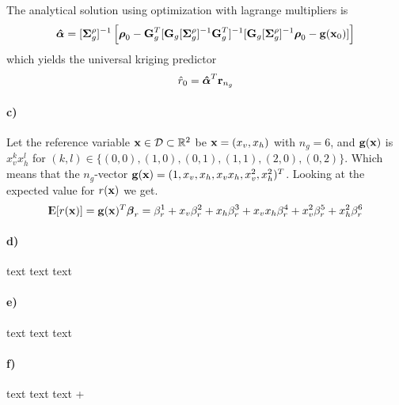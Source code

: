 The analytical solution using optimization with lagrange multipliers is
\begin{equation*}
    \boldsymbol{\mathbf{\hat{\alpha}}} = [\boldsymbol{\mathbf{\Sigma}}_g^\rho]^{-1}\left[\boldsymbol{\mathbf{\rho}}_0 - \boldsymbol{\mathbf{G}}_g^T [\boldsymbol{\mathbf{G}}_g[\boldsymbol{\mathbf{\Sigma}}_g^\rho]^{-1}\boldsymbol{\mathbf{G}}_g^T]^{-1}[\boldsymbol{\mathbf{G}}_g[\boldsymbol{\mathbf{\Sigma}}_g^\rho]^{-1}\boldsymbol{\mathbf{\rho}}_0 - \boldsymbol{\mathbf{g}}(\boldsymbol{\mathbf{x}}_0)]\right]
\end{equation*}
which yields the universal kriging predictor
\begin{equation}
    \hat{r}_0 = \boldsymbol{\mathbf{\hat{\alpha}}}^T \boldsymbol{\mathbf{r}}_{n_g}
\end{equation}
\paragraph{c)}
Let the reference variable $\boldsymbol{\mathbf{x}} \in \mathcal{D} \subset \mathbb{R}^2$ be $\boldsymbol{\mathbf{x}} = (x_v, x_h)$ with $n_g = 6$, and $\boldsymbol{\mathbf{g}}(\boldsymbol{\mathbf{x}})$ is $x_v^kx_h^l$ for $(k,l) \in \{(0,0),(1,0),(0,1),(1,1),(2,0),(0,2)\}$. Which means that the $n_g$-vector $\boldsymbol{\mathbf{g}}(\boldsymbol{\mathbf{x}}) = (1,x_v,x_h,x_vx_h,x_v^2,x_h^2)^T$. Looking at the expected value for $r(\boldsymbol{\mathbf{x}})$ we get.
\begin{equation*}
    {\rm I\kern-.3em E}[r(\boldsymbol{\mathbf{x}})] = \boldsymbol{\mathbf{g}}(\boldsymbol{\mathbf{x}})^T \boldsymbol{\mathbf{\beta}}_r = \beta_r^1 + x_v \beta_r^2 + x_h \beta_r^3 + x_v x_h \beta_r^4 + x_v^2 \beta_r^5 + x_h^2 \beta_r^6
\end{equation*}

\paragraph{d)}
text text text

\paragraph{e)}
text text text

\paragraph{f)}
text text text
+